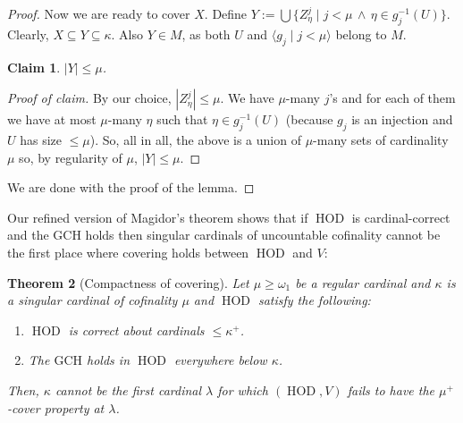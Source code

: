 \documentclass[11pt]{amsart}
\newtheorem{theorem}{Theorem}[section]
\newtheorem{claim}[theorem]{Claim}
\theoremstyle{definition}
\theoremstyle{remark}
\DeclareMathOperator{\HOD}{HOD}
\def\s{\subseteq}
\begin{document}
\begin{proof}
   \smallskip
   

  Now we are ready to cover $X$. Define $Y:=\bigcup\{Z^j_\eta\mid  j<\mu\,\wedge\, \eta\in g^{-1}_j(U)\}.$  Clearly, $X\s Y\s \kappa$. Also $Y\in M$, as both $U$ and $\langle g_j\mid j<\mu\rangle$ belong to $M$.


\begin{claim}
   $|Y|\leq \mu$. 
\end{claim}
\begin{proof}[Proof of claim]
 By our choice, $|Z^j_\eta|\leq \mu$. We have $\mu$-many $j$'s and for each of them we have at most $\mu$-many $\eta$ such that $\eta\in g_j^{-1}(U)$ (because $g_j$ is an injection and $U$ has size ${\leq}\mu$). So, all in all, the above is a union of $\mu$-many sets of cardinality $\mu$ so, by regularity of $\mu$,  $|Y|\leq \mu$. 
\end{proof}
We are done with the proof of the lemma.
\end{proof}
Our refined version of Magidor's theorem shows that if $\HOD$ is cardinal-correct and the GCH holds then singular cardinals of uncountable cofinality cannot be the first place where covering holds between $\HOD$ and $V$:
\begin{theorem}[Compactness of covering]\label{cor: compactness of covering}
Let $\mu\geq \omega_1$ be a regular cardinal and   $\kappa$ is a singular cardinal of  cofinality $\mu$ and  $\HOD$ satisfy  the following:
    \begin{enumerate}
        \item $\HOD$ is correct about cardinals $\leq \kappa^+$.
        \item The $\mathrm{GCH}$ holds in $\HOD$ everywhere below $\kappa$.
    \end{enumerate}
    Then, $\kappa$ cannot be the first cardinal $\lambda$ for which $(\HOD, V)$ fails to have the $\mu^+$-cover property at $\lambda$.
\end{theorem}
\end{document}
